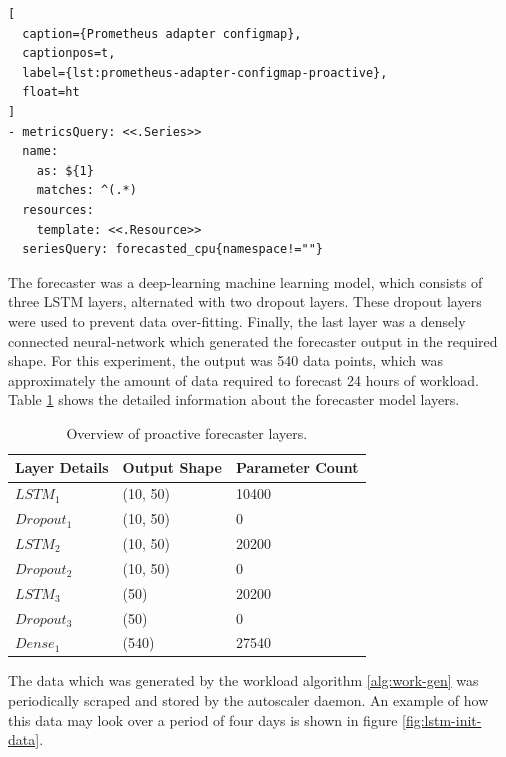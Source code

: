 \begin{lstlisting}[
  caption={Prometheus adapter configmap},
  captionpos=t,
  label={lst:prometheus-adapter-configmap-proactive},
  float=ht
]
- metricsQuery: <<.Series>>
  name:
    as: ${1}
    matches: ^(.*)
  resources:
    template: <<.Resource>>
  seriesQuery: forecasted_cpu{namespace!=""}
\end{lstlisting}

The forecaster was a deep-learning machine learning model, which consists of three LSTM layers, alternated with two dropout layers. These dropout layers were used to prevent data over-fitting. Finally, the last layer was a densely connected neural-network which generated the forecaster output in the required shape. For this experiment, the output was 540 data points, which was approximately the amount of data required to forecast 24 hours of workload. Table \ref{tab:lstm-layers} shows the detailed information about the forecaster model layers.\par

\begin{table}
    \caption{Overview of proactive forecaster layers.}\label{tab:lstm-layers}
    \centering
    \begin{tabular}{|l|l|l|}
        \hline
        Layer Details & Output Shape & Parameter Count\\
        \hline
        $LSTM_{1}$ & (10, 50) & 10400\\
        $Dropout_{1}$ & (10, 50) & 0\\
        $LSTM_{2}$ & (10, 50) & 20200\\
        $Dropout_{2}$ & (10, 50) & 0\\
        $LSTM_{3}$ & (50) & 20200\\
        $Dropout_{3}$ & (50) & 0\\
        $Dense_{1}$ & (540) & 27540\\
        \hline
    \end{tabular}
\end{table}


The data which was generated by the workload algorithm \ref{alg:work-gen} was periodically scraped and stored by the autoscaler daemon. An example of how this data may look over a period of four days is shown in figure \ref{fig:lstm-init-data}.

